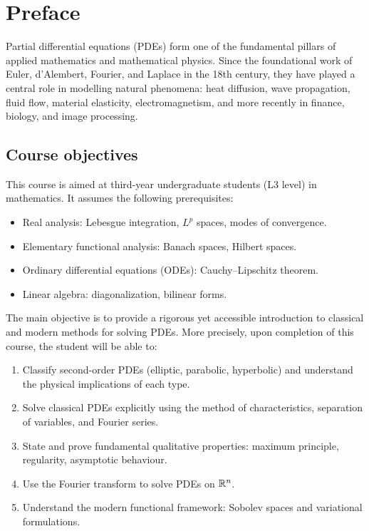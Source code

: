 \chapter*{Preface}

Partial differential equations (PDEs) form one of the fundamental pillars of
applied mathematics and mathematical physics. Since the foundational work of
Euler, d'Alembert, Fourier, and Laplace in the 18th century, they have played
a central role in modelling natural phenomena: heat diffusion, wave propagation,
fluid flow, material elasticity, electromagnetism, and more recently in finance,
biology, and image processing.

\section*{Course objectives}

This course is aimed at third-year undergraduate students (L3 level) in
mathematics. It assumes the following prerequisites:
\begin{itemize}
    \item Real analysis: Lebesgue integration, $L^p$ spaces, modes of convergence.
    \item Elementary functional analysis: Banach spaces, Hilbert spaces.
    \item Ordinary differential equations (ODEs): Cauchy--Lipschitz theorem.
    \item Linear algebra: diagonalization, bilinear forms.
\end{itemize}

The main objective is to provide a rigorous yet accessible introduction to
classical and modern methods for solving PDEs. More precisely, upon
completion of this course, the student will be able to:
\begin{enumerate}
    \item Classify second-order PDEs (elliptic, parabolic, hyperbolic) and
          understand the physical implications of each type.
    \item Solve classical PDEs explicitly using the method of characteristics,
          separation of variables, and Fourier series.
    \item State and prove fundamental qualitative properties: maximum principle,
          regularity, asymptotic behaviour.
    \item Use the Fourier transform to solve PDEs on $\mathbb{R}^n$.
    \item Understand the modern functional framework: Sobolev spaces and
          variational formulations.
\end{enumerate}

